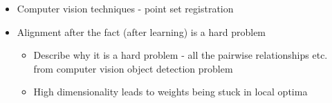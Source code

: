     \begin{itemize}

        \item Computer vision techniques - point set registration
        \item Alignment after the fact (after learning) is a hard problem
        \begin{itemize}
            \item Describe why it is a hard problem - all the pairwise relationships etc. from computer vision object detection problem
            \item High dimensionality leads to weights being stuck in local optima
        \end{itemize}
    \end{itemize}


